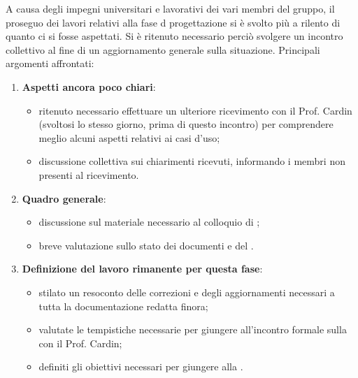 A causa degli impegni universitari e lavorativi dei vari  membri del gruppo, il proseguo dei lavori relativi alla fase d progettazione si è svolto più a rilento di quanto ci si fosse aspettati. Si è ritenuto necessario perciò svolgere un incontro collettivo al fine di un aggiornamento generale sulla situazione.
Principali argomenti affrontati:
\begin{enumerate}
    \item \textbf{Aspetti ancora poco chiari}:
        \begin{itemize}
            \item ritenuto necessario effettuare un ulteriore ricevimento con il Prof. Cardin (svoltosi lo stesso giorno, prima di questo incontro) per comprendere meglio alcuni aspetti relativi ai casi d'uso;
            \item discussione collettiva sui chiarimenti ricevuti, informando i membri non presenti al ricevimento.
        \end{itemize}
    \item \textbf{Quadro generale}:
        \begin{itemize}
            \item discussione sul materiale necessario al colloquio di ;
            \item breve valutazione sullo stato dei documenti e del .
        \end{itemize}
    \item \textbf{Definizione del lavoro rimanente per questa fase}:
        \begin{itemize}
            \item stilato un resoconto delle correzioni e degli aggiornamenti necessari a tutta la documentazione redatta finora;
            \item valutate le tempistiche necessarie per giungere all'incontro formale sulla  con il Prof. Cardin;
            \item definiti gli obiettivi necessari per giungere alla \RP.
        \end{itemize}
\end{enumerate}